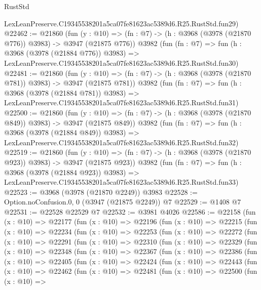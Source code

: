 \begin{lexlean}{RustStd}
\begin{coremodule}
    LexLeanPreserve.C19345538201a5ca07fe81623ac5389d6.R25.RustStd.fun29)
@22462 := @21860
    (fun (y : @10) => (fn : @7) -> (h : @3968 (@3978 (@21870 @776)) @3983) -> @3947 (@21875 @776))
    @3982
    (fun (fn : @7) =>
    fun (h : @3968 (@3978 (@21884 @776)) @3983) =>
    LexLeanPreserve.C19345538201a5ca07fe81623ac5389d6.R25.RustStd.fun30)
@22481 := @21860
    (fun (y : @10) => (fn : @7) -> (h : @3968 (@3978 (@21870 @781)) @3983) -> @3947 (@21875 @781))
    @3982
    (fun (fn : @7) =>
    fun (h : @3968 (@3978 (@21884 @781)) @3983) =>
    LexLeanPreserve.C19345538201a5ca07fe81623ac5389d6.R25.RustStd.fun31)
@22500 := @21860
    (fun (y : @10) => (fn : @7) -> (h : @3968 (@3978 (@21870 @849)) @3983) -> @3947 (@21875 @849))
    @3982
    (fun (fn : @7) =>
    fun (h : @3968 (@3978 (@21884 @849)) @3983) =>
    LexLeanPreserve.C19345538201a5ca07fe81623ac5389d6.R25.RustStd.fun32)
@22519 := @21860
    (fun (y : @10) => (fn : @7) -> (h : @3968 (@3978 (@21870 @923)) @3983) -> @3947 (@21875 @923))
    @3982
    (fun (fn : @7) =>
    fun (h : @3968 (@3978 (@21884 @923)) @3983) =>
    LexLeanPreserve.C19345538201a5ca07fe81623ac5389d6.R25.RustStd.fun33)
@22523 := @3968 (@3978 (@21870 @2249)) @3983
@22528 := Option.noConfusion.{0, 0} (@3947 (@21875 @2249)) @7
@22529 := @1408 @7
@22531 := @22528 @22529 @7
@22532 := @3981 @4026
@22586 := @22158
    (fun (x : @10) =>
    @22177
      (fun (x : @10) =>
      @22196
        (fun (x : @10) =>
        @22215
          (fun (x : @10) =>
          @22234
            (fun (x : @10) =>
            @22253
              (fun (x : @10) =>
              @22272
                (fun (x : @10) =>
                @22291
                  (fun (x : @10) =>
                  @22310
                    (fun (x : @10) =>
                    @22329
                      (fun (x : @10) =>
                      @22348
                        (fun (x : @10) =>
                        @22367
                          (fun (x : @10) =>
                          @22386
                            (fun (x : @10) =>
                            @22405
                              (fun (x : @10) =>
                              @22424
                                (fun (x : @10) =>
                                @22443
                                  (fun (x : @10) =>
                                  @22462
                                    (fun (x : @10) =>
                                    @22481
                                      (fun (x : @10) =>
                                      @22500
                                        (fun (x : @10) =>

\end{coremodule}
\end{lexlean}
